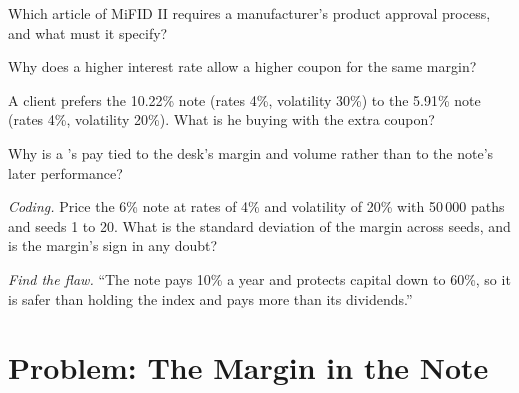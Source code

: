 \begin{exercise}[$\star$]\label{exo:in:structurer-sales-and-sales-trader:3}
Which article of MiFID II requires a manufacturer's product approval process, and what must it specify?
\end{exercise}

\begin{exercise}[$\star\star$]\label{exo:in:structurer-sales-and-sales-trader:4}
Why does a higher interest rate allow a higher coupon for the same margin?
\end{exercise}

\begin{exercise}[$\star\star$]\label{exo:in:structurer-sales-and-sales-trader:5}
A client prefers the 10.22\% note (rates 4\%, volatility 30\%) to the 5.91\% note (rates 4\%, volatility 20\%). What is
he buying with the extra coupon?
\end{exercise}

\begin{exercise}[$\star\star$]\label{exo:in:structurer-sales-and-sales-trader:6}
Why is a 's pay tied to the desk's margin and volume rather than to the note's later performance?
\end{exercise}

\begin{exercise}[$\star\star\star$]\label{exo:in:structurer-sales-and-sales-trader:7}
\emph{Coding.} Price the 6\% note at rates of 4\% and volatility of 20\% with 50\,000 paths and seeds 1 to 20. What is the
standard deviation of the margin across seeds, and is the margin's sign in any doubt?
\end{exercise}

\begin{exercise}[$\star\star\star$]\label{exo:in:structurer-sales-and-sales-trader:8}
\emph{Find the flaw.} ``The note pays 10\% a year and protects capital down to 60\%, so it is safer than holding the
index and pays more than its dividends.''
\end{exercise}

\section{Problem: The Margin in the Note}


